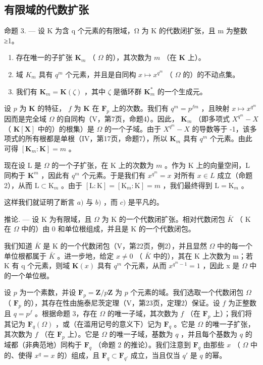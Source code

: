 \subsection{有限域的代数扩张}

命题 3. --- 设 K 为含 q 个元素的有限域，Ω 为 K 的代数闭扩张，且 m 为整数 ≥1。

\begin{enumerate}
\def\labelenumi{\alph{enumi})}
\item
  存在唯一的子扩张 \(\mathbf{K}_m\) （ \(\Omega\) 的），其次数为 \(m\) （在 \(\mathbf{K}\) 上）。
\item
  域 \(K_{m}\) 具有 \(q^{m}\) 个元素，并且是自同构 \(x \mapsto x^{q^{m}}\) （ \(\Omega\) 的）的不动点集。
\item
  我们有 \(\mathbf{K}_m = \mathbf{K}(\zeta)\) ，其中 \(\zeta\) 是循环群 \(\mathbf{K}_m^*\) 的一个生成元。
\end{enumerate}

设 \(p\) 为 \(\mathbf{K}\) 的特征， \(f\) 为 \(\mathbf{K}\) 在 \(\mathbf{F}_p\) 上的次数。我们有 \(q^m = p^{fm}\) ，且映射 \(x \mapsto x^{q^m}\) 因而是完全域 \(\Omega\) 的自同构（V，第7页，命题4）。因此， \(\mathbf{K}_m\) （即多项式 \(X^{q^m} - X\) （ \(\mathbf{K}[\mathbf{X}]\) 中的）的根集）是 \(\Omega\) 的一个子域。由于 \(X^{q^m} - X\) 的导数等于 -1，该多项式的所有根都是单根（IV，第17页，命题7），所以 \(\mathbf{K}_m\) 具有 \(q^m\) 个元素。由此可得 \([\mathbf{K}_m : \mathbf{K}] = m\) 。

现在设 L 是 \(\Omega\) 的一个子扩张，在 K 上的次数为 \(m\) 。作为 K 上的向量空间，L 同构于 \(\mathbf{K}^m\) ，因此有 \(q^m\) 个元素。于是我们有 \(x^{q^m} = x\) 对所有 \(x \in L\) 成立（命题 2），从而 \(\mathrm{L} \subset \mathrm{K}_m\) 。由于 \([\mathrm{L} : \mathrm{K}] = [\mathrm{K}_m : \mathrm{K}] = m\) ，我们最终得到 \(\mathrm{L} = \mathrm{K}_m\) 。

这样我们就证明了断言 \(a)\) 与 \(b)\) ，而 \(c)\) 是平凡的。

推论. --- 设 K 为有限域，且 \(\Omega\) 为 K 的一个代数闭扩张。相对代数闭包 \(\bar{K}\) （ K 在 \(\Omega\) 中的）由 0 和单位根组成，并且是 K 的一个代数闭包。

我们知道 \(\bar{K}\) 是 K 的一个代数闭包（V，第22页，例2），并且显然 \(\Omega\) 中的每一个单位根都属于 \(\bar{K}\) 。进一步地，给定 \(x \neq 0\) （ \(\bar{K}\) 中的），其在 K 上次数为 m；若 K 有 q 个元素，则域 \(\mathbf{K}(x)\) 具有 \(q^{m}\) 个元素，从而 \(x^{q^{m}-1} = 1\) ，因此 x 是 \(\Omega\) 中的一个单位根。

设 \(p\) 为一个素数，并设 \(\mathbf{F}_p = \mathbf{Z} / p\mathbf{Z}\) 为 \(p\) 个元素的域。我们选取一个代数闭包 \(\Omega\) （ \(\mathbf{F}_p\) 的），其存在性由施泰尼茨定理（V，第23页，定理2）保证。设 \(f\) 为正整数且 \(q = p^f\) 。根据命题 3，存在 \(\Omega\) 的唯一子域，其次数为 \(f\) （在 \(\mathbf{F}_p\) 上）；我们将其记为 \(\mathbf{F}_q(\Omega)\) ，或（在滥用记号的意义下）记为 \(\mathbf{F}_q\) 。它是 \(\Omega\) 的唯一子扩张，其次数为 \(f\) （在 \(\mathbf{F}_p\) 上）。它是 \(\Omega\) 的唯一子域，基数为 \(q\) ，并且每个基数为 \(q\) 的域都（非典范地）同构于 \(\mathbf{F}_q\) （命题 2 的推论）。我们注意到 \(\mathbf{F}_q\) 由那些 \(x\) （ \(\Omega\) 中的、使得 \(x^q = x\) 的）组成，且 \(\mathbf{F}_q \subset \mathbf{F}_{q'}\) 成立，当且仅当 \(q'\) 是 \(q\) 的幂。

